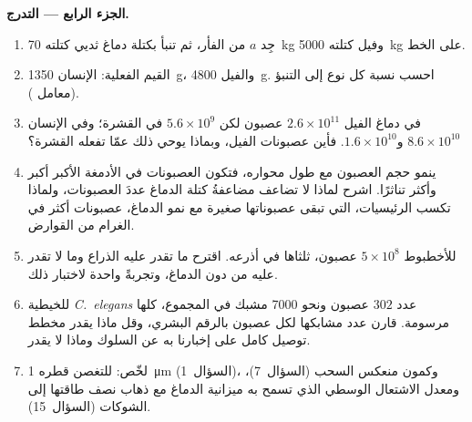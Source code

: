 \begin{problem}
\medskip
\noindent\textbf{الجزء الرابع --- التدرج.}
\begin{enumerate}[resume]
  \item جِد $a$ من الفأر، ثم تنبأ بكتلة دماغ ثديي كتلته
        \qty{70}{kg} وفيل كتلته \qty{5000}{kg} على الخط.
  \item القيم الفعلية: الإنسان \qty{1350}{g}، والفيل
        \qty{4800}{g}. احسب نسبة كل نوع إلى التنبؤ (معامل
        ).
  \item في دماغ الفيل $2.6\times 10^{11}$ عصبون لكن
        $5.6\times 10^{9}$ في القشرة؛ وفي الإنسان $8.6\times 10^{10}$
        و$1.6\times 10^{10}$. فأين عصبونات الفيل، وبماذا يوحي
        ذلك عمّا تفعله القشرة؟
  \item ينمو حجم العصبون مع طول محواره، فتكون العصبونات في
        الأدمغة الأكبر أكبر وأكثر تناثرًا. اشرح لماذا لا
        تضاعف مضاعفةُ كتلة الدماغ عددَ العصبونات، ولماذا
        تكسب الرئيسيات، التي تبقى عصبوناتها صغيرة مع نمو
        الدماغ، عصبونات أكثر في الغرام من القوارض.
  \item للأخطبوط $5\times 10^{8}$ عصبون، ثلثاها في أذرعه.
        اقترح ما تقدر عليه الذراع وما لا تقدر عليه من دون
        الدماغ، وتجربةً واحدة لاختبار ذلك.
  \item للخيطية \emph{C.~elegans} عدد $302$ عصبون ونحو
        \num{7000} مشبك في المجموع، كلها مرسومة. قارن عدد
        مشابكها لكل عصبون بالرقم البشري، وقل ماذا يقدر مخطط
        توصيل كامل على إخبارنا به عن السلوك وماذا لا يقدر.
  \item لخّص:  للتغصن قطره \qty{1}{\micro m}
        (السؤال~1)، وكمون منعكس السحب (السؤال~7)، ومعدل
        الاشتعال الوسطي الذي تسمح به ميزانية الدماغ مع ذهاب
        نصف طاقتها إلى الشوكات (السؤال~15).
\end{enumerate}
\end{problem}
